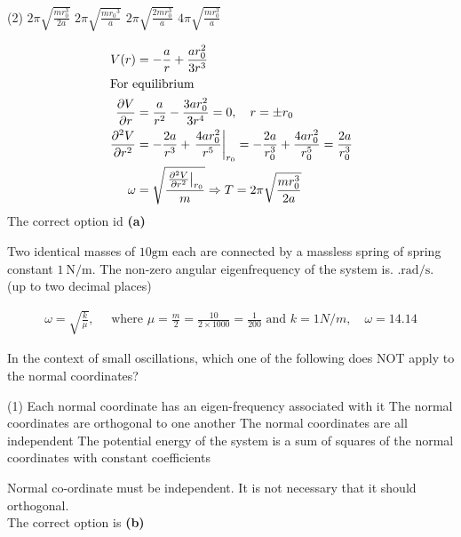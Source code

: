 \begin{enumerate}
\begin{minipage}{\textwidth}
\end{minipage}
\begin{tasks}(2)
	\task[\textbf{A.}] $2 \pi \sqrt{\frac{m r_{0}^{3}}{2 a}}$
	\task[\textbf{B.}]$2 \pi \sqrt{\frac{m r_{0}{ }^{3}}{a}}$
	\task[\textbf{C.}]$2 \pi \sqrt{\frac{2 m r_{0}^{3}}{a}}$
	\task[\textbf{D.}]$4 \pi \sqrt{\frac{m r_{0}^{3}}{a}}$
\end{tasks}
\begin{answer}
\begin{align*}
V(r)&=-\frac{a}{r}+\frac{a r_{0}^{2}}{3 r^{3}}\\
\intertext{For equilibrium}
\frac{\partial V}{\partial r}&=\frac{a}{r^{2}}-\frac{3 a r_{0}^{2}}{3 r^{4}}=0, \quad r=\pm r_{0}\\
\frac{\partial^{2} V}{\partial r^{2}}&=-\frac{2 a}{r^{3}}+\left.\frac{4 a r_{0}^{2}}{r^{5}}\right|_{r_{0}}=-\frac{2 a}{r_{0}^{3}}+\frac{4 a r_{0}^{2}}{r_{0}^{5}}=\frac{2 a}{r_{0}^{3}}\\
\omega&=\sqrt{\frac{\left.\frac{\partial^{2} V}{\partial r^{2}}\right|_{r_{0}}}{m}} \Rightarrow T=2 \pi \sqrt{\frac{m r_{0}^{3}}{2 a}}
\end{align*}
The correct option id \textbf{(a)}
\end{answer}
\begin{minipage}{\textwidth}
	\item Two identical masses of $10 \mathrm{gm}$ each are connected by a massless spring of spring constant $1 \mathrm{~N} / \mathrm{m}$. The non-zero angular eigenfrequency of the system is. $. \mathrm{rad} / \mathrm{s} .$ (up to two decimal places)
\end{minipage}
\begin{answer}
\begin{align*}
\omega=\sqrt{\frac{k}{\mu}}, \quad \text { where } \mu=\frac{m}{2}=\frac{10}{2 \times 1000}=\frac{1}{200} \text { and } k=1 N / m, \quad \omega=14.14
\end{align*}
\end{answer}
\begin{minipage}{\textwidth}
	\item In the context of small oscillations, which one of the following does NOT apply to the normal coordinates?
\end{minipage}
\begin{tasks}(1)
	\task[\textbf{A.}] Each normal coordinate has an eigen-frequency associated with it
	\task[\textbf{B.}]The normal coordinates are orthogonal to one another
	\task[\textbf{C.}]The normal coordinates are all independent
	\task[\textbf{D.}]The potential energy of the system is a sum of squares of the normal coordinates with constant coefficients
\end{tasks}
\begin{answer}
 Normal co-ordinate must be independent. It is not necessary that it should orthogonal.\\
 The correct option is \textbf{(b)}	
\end{answer}

\end{enumerate}
